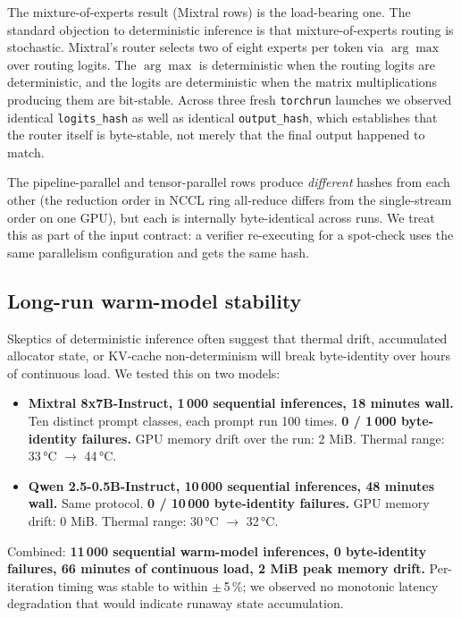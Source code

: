 \documentclass[10pt]{article}
\begin{document}
The mixture-of-experts result (Mixtral rows) is the load-bearing one. The standard objection to deterministic inference is that mixture-of-experts routing is stochastic. Mixtral's router selects two of eight experts per token via $\arg\max$ over routing logits. The $\arg\max$ is deterministic when the routing logits are deterministic, and the logits are deterministic when the matrix multiplications producing them are bit-stable. Across three fresh \texttt{torchrun} launches we observed identical \texttt{logits\_hash} as well as identical \texttt{output\_hash}, which establishes that the router itself is byte-stable, not merely that the final output happened to match.

The pipeline-parallel and tensor-parallel rows produce \emph{different} hashes from each other (the reduction order in NCCL ring all-reduce differs from the single-stream order on one GPU), but each is internally byte-identical across runs. We treat this as part of the input contract: a verifier re-executing for a spot-check uses the same parallelism configuration and gets the same hash.

\subsection{Long-run warm-model stability}

Skeptics of deterministic inference often suggest that thermal drift, accumulated allocator state, or KV-cache non-determinism will break byte-identity over hours of continuous load. We tested this on two models:

\begin{itemize}
\item \textbf{Mixtral 8x7B-Instruct, 1\,000 sequential inferences, 18 minutes wall.} Ten distinct prompt classes, each prompt run 100 times. \textbf{0 / 1\,000 byte-identity failures.} GPU memory drift over the run: 2 MiB. Thermal range: 33\,°C $\to$ 44\,°C.
\item \textbf{Qwen 2.5-0.5B-Instruct, 10\,000 sequential inferences, 48 minutes wall.} Same protocol. \textbf{0 / 10\,000 byte-identity failures.} GPU memory drift: 0 MiB. Thermal range: 30\,°C $\to$ 32\,°C.
\end{itemize}

Combined: \textbf{11\,000 sequential warm-model inferences, 0 byte-identity failures, 66 minutes of continuous load, 2 MiB peak memory drift.} Per-iteration timing was stable to within $\pm$\,5\,\%; we observed no monotonic latency degradation that would indicate runaway state accumulation.
\end{document}
